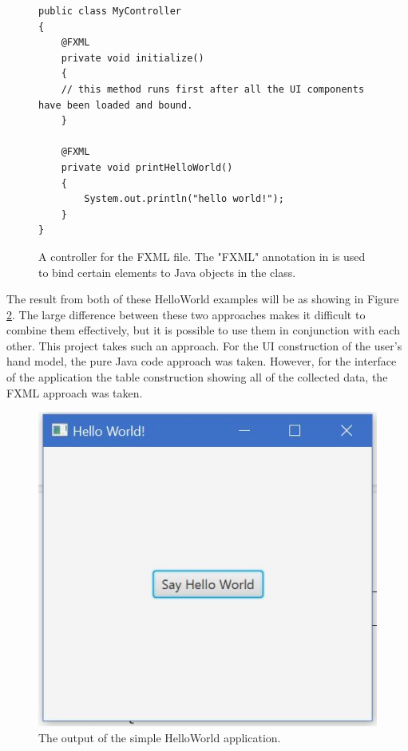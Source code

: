 \begin{figure}[th]
\centering
\begin{lstlisting}
public class MyController 
{
	@FXML
	private void initialize() 
	{
	// this method runs first after all the UI components have been loaded and bound.
	}
	
	@FXML
	private void printHelloWorld() 
	{
		System.out.println("hello world!");
	}
}
\end{lstlisting}
\caption[Controller for FXML]{A controller for the FXML file. The "FXML" annotation in is used to bind certain elements to Java objects in the class.}
\label{fig:simpleController}
\end{figure}

The result from both of these HelloWorld examples will be as showing in Figure \ref{fig:helloWorldResult}. The large difference between these two approaches makes it difficult to combine them effectively, but it is possible to use them in conjunction with each other. This project takes such an approach. For the UI construction of the user's hand model, the pure Java code approach was taken. However, for the interface of the application the table construction showing all of the collected data, the FXML approach was taken. 

\begin{figure}[th]
\centering
\includegraphics[scale=0.5]{Figures/helloWorldResult.JPG}
\caption[JavaFX Application Output]{The output of the simple HelloWorld application.}
\label{fig:helloWorldResult}
\end{figure}

